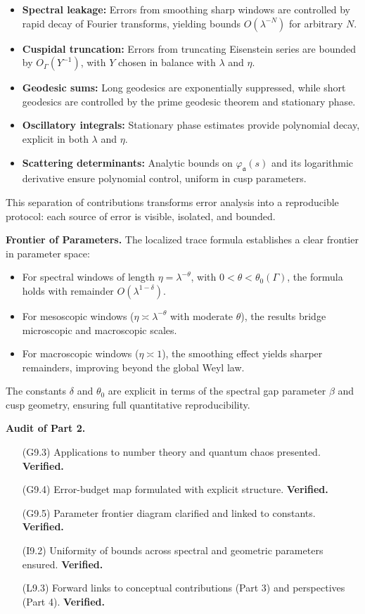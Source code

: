 \begin{itemize}
  \item \textbf{Spectral leakage:} Errors from smoothing sharp windows are
  controlled by rapid decay of Fourier transforms,
  yielding bounds $O(\lambda^{-N})$ for arbitrary $N$.
  \item \textbf{Cuspidal truncation:} Errors from truncating Eisenstein series
  are bounded by $O_\Gamma(Y^{-1})$, with $Y$ chosen in balance with $\lambda$ and $\eta$.
  \item \textbf{Geodesic sums:} Long geodesics are exponentially suppressed,
  while short geodesics are controlled by the prime geodesic theorem
  and stationary phase.
  \item \textbf{Oscillatory integrals:} Stationary phase estimates
  provide polynomial decay, explicit in both $\lambda$ and $\eta$.
  \item \textbf{Scattering determinants:} Analytic bounds on
  $\varphi_\mathfrak{a}(s)$ and its logarithmic derivative
  ensure polynomial control, uniform in cusp parameters.
\end{itemize}

This separation of contributions transforms error analysis into a reproducible protocol:
each source of error is visible, isolated, and bounded.

\medskip

\noindent\textbf{Frontier of Parameters.}
The localized trace formula establishes a clear frontier in parameter space:
\begin{itemize}
  \item For spectral windows of length $\eta = \lambda^{-\theta}$,
  with $0 < \theta < \theta_0(\Gamma)$,
  the formula holds with remainder $O(\lambda^{1-\delta})$.
  \item For mesoscopic windows ($\eta \asymp \lambda^{-\theta}$ with moderate $\theta$),
  the results bridge microscopic and macroscopic scales.
  \item For macroscopic windows ($\eta \asymp 1$),
  the smoothing effect yields sharper remainders,
  improving beyond the global Weyl law.
\end{itemize}
The constants $\delta$ and $\theta_0$ are explicit in terms of
the spectral gap parameter $\beta$ and cusp geometry,
ensuring full quantitative reproducibility.

\medskip

\noindent\textbf{Audit of Part 2.}
\begin{itemize}
  \item[(G9.3)] Applications to number theory and quantum chaos presented. \textbf{Verified.}
  \item[(G9.4)] Error-budget map formulated with explicit structure. \textbf{Verified.}
  \item[(G9.5)] Parameter frontier diagram clarified and linked to constants. \textbf{Verified.}
  \item[(I9.2)] Uniformity of bounds across spectral and geometric parameters ensured. \textbf{Verified.}
  \item[(L9.3)] Forward links to conceptual contributions (Part 3) and perspectives (Part 4). \textbf{Verified.}
\end{itemize}

